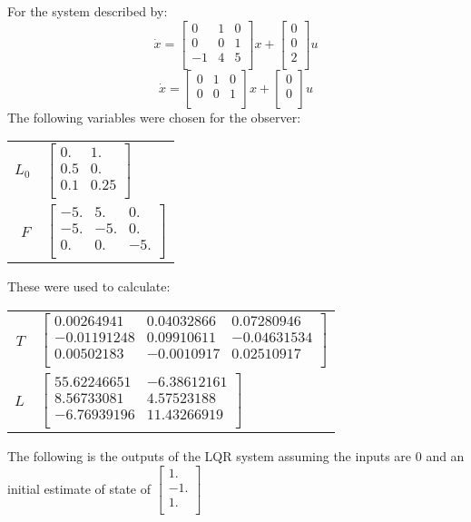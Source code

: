For the system described by: 
\begin{equation}
\dot x = 
\begin{bmatrix}
  0 & 1 & 0\\
  0 & 0 & 1\\
  -1 & 4 & 5\\
\end{bmatrix}x + 
\begin{bmatrix}
  0\\
  0\\
  2\\
\end{bmatrix}u
\end{equation}
\begin{equation}
\dot x = 
\begin{bmatrix}
  0 & 1 & 0\\
  0 & 0 & 1\\
\end{bmatrix}x + 
\begin{bmatrix}
  0\\
  0\\
\end{bmatrix}u
\end{equation}
The following variables were chosen for the observer:

\begin{tabular}{r|l}
$L_0$ & $
\begin{bmatrix}
  0. & 1.\\
  0.5 & 0.\\
  0.1 & 0.25\\
\end{bmatrix}$\\
$F$ & $
\begin{bmatrix}
  -5. & 5. & 0.\\
  -5. & -5. & 0.\\
  0. & 0. & -5.\\
\end{bmatrix}$\\
\end{tabular}

These were used to calculate: 

\begin{tabular}{r|l}
$T$ & $
\begin{bmatrix}
  0.00264941 & 0.04032866 & 0.07280946\\
  -0.01191248 & 0.09910611 & -0.04631534\\
  0.00502183 & -0.0010917 & 0.02510917\\
\end{bmatrix}$\\
$L$ & $
\begin{bmatrix}
  55.62246651 & -6.38612161\\
  8.56733081 & 4.57523188\\
  -6.76939196 & 11.43266919\\
\end{bmatrix}$\\
\end{tabular}

The following is the outputs of the LQR system assuming the inputs are 0 and an initial estimate of state of $
\begin{bmatrix}
  1.\\
  -1.\\
  1.\\
\end{bmatrix}$

